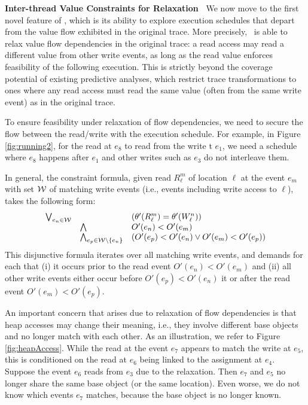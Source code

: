 {\bf Inter-thread Value Constraints for Relaxation\ } We now move to the first novel feature of \tool, which is its ability to explore execution schedules that depart from the value flow exhibited in the original trace. More precisely, \tool\ is able to relax value flow dependencies in the original trace:  a read access may read a
different value from other write events, as long as the read value enforces feasibility of the following execution.
 This is strictly beyond the coverage potential of existing predictive analyses, which restrict trace transformations to ones where any read access must read the same  value (often from the same write event) as in the original trace. 

To ensure feasibility under relaxation of flow dependencies, we need to secure the flow between the read/write with the execution schedule. 
For example, in Figure \ref{fig:running2}, for the read at $e_8$ to read from the write t $e_1$, we need a schedule where 
$e_8$ happens after $e_1$ and other writes such as $e_3$ do not interleave them.




In general, the constraint formula, given read $R^{m}_{\ell}$ of location $\ell$ at the event $e_m$ with set ${\cal W}$ of matching write events (i.e., events including write access to $\ell$), takes the following form:
$$
\begin{array}{rll}
\bigvee_{e_n \in {\cal W}} &  & (\theta'(R^{m}_{\ell}) = \theta'(W^{n}_{\ell})) \\
&		\bigwedge 	&  O'(e_n) < O'(e_m) \\
&		\bigwedge_{e_p \in {\cal W} \setminus \{ e_n \}} & (O'(e_p) < O'(e_n) \vee O'(e_m) < O'(e_p))
\end{array}
$$
This disjunctive formula iterates over all matching write events, and demands for each that (i) it occurs prior to the read event $O'(e_n) < O'(e_m)$ and (ii) all other write events either occur before $O'(e_p) < O'(e_n)$ it or after the read event
$O'(e_m) < O'(e_p)$.

An important concern that arises due to relaxation of flow dependencies is that heap accesses may change their meaning, i.e., they involve different base objects and no longer match with each other. As an illustration, we refer to Figure \ref{fig:heapAccess}. While the read at the event $e_7$ appears to match the write at $e_5$, this is conditioned on the read at $e_6$ being linked to the assignment at $e_4$. Suppose  the event $e_6$ reads from $e_3$ due to the relaxation. Then $e_7$ and $e_5$ no longer share the same base object (or the same location). Even worse, we do not know which events $e_7$ matches, because the base object is no longer known.



